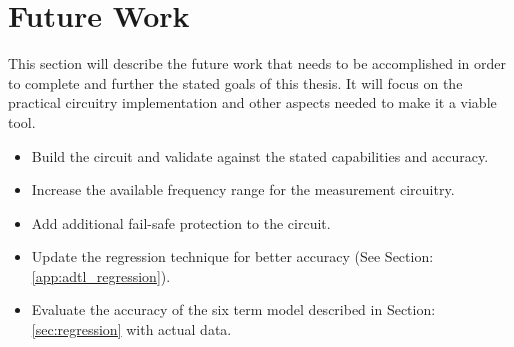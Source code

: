 \section {Future Work}
\label{sec:futureWork}

This section will describe the future work that needs to be accomplished in order to complete and further the stated goals of this thesis. It will focus on the practical circuitry implementation and other aspects needed to make it a viable tool.

\begin{itemize}
    \item Build the circuit and validate against the stated capabilities and accuracy.
    \item Increase the available frequency range for the measurement circuitry.
    \item Add additional fail-safe protection to the circuit.
    \item Update the regression technique for better accuracy (See Section: \ref{app:adtl_regression}).
    \item Evaluate the accuracy of the six term model described in Section: \ref{sec:regression} with actual data.
\end{itemize}

